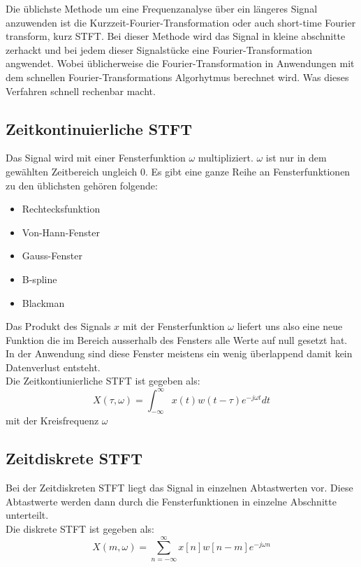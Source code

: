 
Die üblichste Methode um eine Frequenzanalyse über ein längeres Signal anzuwenden ist die  Kurzzeit-Fourier-Transformation oder auch short-time Fourier transform, kurz STFT. Bei dieser Methode wird das Signal in kleine abschnitte zerhackt und bei jedem dieser Signalstücke eine Fourier-Transformation angwendet. Wobei üblicherweise die Fourier-Transformation in Anwendungen mit dem schnellen Fourier-Transformations Algorhytmus berechnet wird. Was dieses Verfahren schnell rechenbar macht.

\subsection{Zeitkontinuierliche STFT}
Das Signal wird mit einer Fensterfunktion $\omega $ multipliziert. $\omega $ ist nur in dem gewählten Zeitbereich ungleich 0. Es gibt eine ganze Reihe an Fensterfunktionen zu den üblichsten gehören folgende:

\begin{itemize}
	\item Rechtecksfunktion
	\item Von-Hann-Fenster
	\item Gauss-Fenster
	\item B-spline
	\item Blackman
\end{itemize}


Das Produkt des Signals $x$ mit der Fensterfunktion $\omega $ liefert uns also eine neue Funktion die im Bereich ausserhalb des Fensters alle Werte auf null gesetzt hat. In der Anwendung sind diese Fenster meistens ein wenig überlappend damit kein Datenverlust entsteht. \\
Die Zeitkontiunierliche STFT ist  gegeben als:
\begin{equation}
X(\tau, \omega)=\int_{-\infty}^{\infty} x(t) w(t-\tau) e^{-j \omega t} dt
\end{equation}
mit der Kreisfrequenz  $\omega $

\subsection{Zeitdiskrete STFT}
Bei der Zeitdiskreten STFT liegt das Signal in einzelnen Abtastwerten vor. Diese Abtastwerte werden dann durch die Fensterfunktionen in einzelne Abschnitte unterteilt. \\
Die diskrete STFT ist gegeben als:
\begin{equation}
X(m, \omega)=\sum_{n=-\infty}^{\infty} x[n] w[n-m] e^{-j \omega n}
\end{equation}

